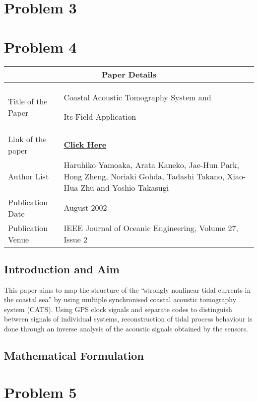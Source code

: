 \documentclass[a4paper,11pt]{article}
\numberwithin{definition}{section}
\numberwithin{mytheorem}{subsection}
\begin{document}
\section{Problem 3}


\section{Problem 4}


\begin{center}
    \begin{tabular}{ |p{3.5cm}||p{10cm}|}
   
    \hline
    \multicolumn{2}{|c|}{Paper Details} \\
    \hline
    Title of the Paper& Coastal Acoustic Tomography System and 
    
    Its Field Application\\
    \hline
    Link of the paper  &  \href{https://ieeexplore.ieee.org/document/1002483}{\textbf{Click Here}}  \\
    \hline
    Author List & Haruhiko Yamoaka, Arata Kaneko, Jae-Hun Park, Hong Zheng, Noriaki Gohda, Tadashi Takano, Xiao-Hua Zhu and Yoshio Takasugi \\
    \hline
    Publication Date  & August 2002 \\
    \hline
    Publication Venue  &  IEEE Journal of Oceanic Engineering, Volume 27, Issue 2 \\
    \hline
   \end{tabular}
\end{center}

\subsection{Introduction and Aim}

This paper aims to map the structure of the ``strongly
nonlinear tidal currents in the coastal sea'' by using multiple synchronised coastal acoustic tomography system (CATS). Using GPS clock signals and separate codes to distinguish between signals of individual systems, reconstruction of tidal process behaviour is done through an inverse analysis of the acoustic signals obtained by the sensors.

\subsection{Mathematical Formulation}



\section{Problem 5}
\end{document}
